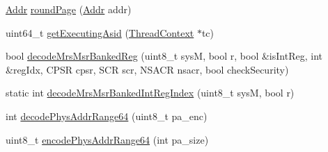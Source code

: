 \begin{DoxyCompactItemize}
\item 
\hyperlink{classm5_1_1params_1_1Addr}{Addr} \hyperlink{namespaceArmISA_a3af4ba23ba9adc32c54a1587dbf17cf7}{roundPage} (\hyperlink{classm5_1_1params_1_1Addr}{Addr} addr)
\item 
uint64\_\-t \hyperlink{namespaceArmISA_a277f16254a40dea78dd28b3ae0d7f641}{getExecutingAsid} (\hyperlink{classThreadContext}{ThreadContext} $\ast$tc)
\item 
bool \hyperlink{namespaceArmISA_a3fca9110b8d314ec5613193c452ded7e}{decodeMrsMsrBankedReg} (uint8\_\-t sysM, bool r, bool \&isIntReg, int \&regIdx, CPSR cpsr, SCR scr, NSACR nsacr, bool checkSecurity)
\item 
static int \hyperlink{namespaceArmISA_a1b1e3eb6c94c999f4a770af53577cd65}{decodeMrsMsrBankedIntRegIndex} (uint8\_\-t sysM, bool r)
\item 
int \hyperlink{namespaceArmISA_a6604aa91f07e901f32fdc217cdf99d09}{decodePhysAddrRange64} (uint8\_\-t pa\_\-enc)
\item 
uint8\_\-t \hyperlink{namespaceArmISA_a97ebf02aa31c9d7a9521bea30bd222c5}{encodePhysAddrRange64} (int pa\_\-size)
\end{DoxyCompactItemize}
